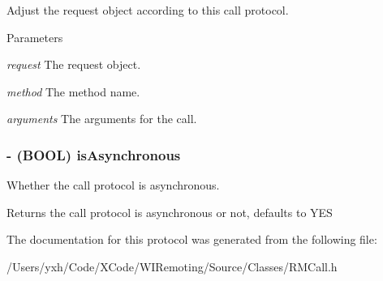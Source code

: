 Adjust the request object according to this call protocol. 
\begin{DoxyParams}{Parameters}
\item[{\em request}]The request object. \item[{\em method}]The method name. \item[{\em arguments}]The arguments for the call. \end{DoxyParams}
\hypertarget{protocol_r_m_call_protocol-p_ae4432e31198f1f116480ec4f1ed46d92}{
\subsubsection[{isAsynchronous}]{\setlength{\rightskip}{0pt plus 5cm}-\/ (BOOL) isAsynchronous }}
\label{protocol_r_m_call_protocol-p_ae4432e31198f1f116480ec4f1ed46d92}


Whether the call protocol is asynchronous. \begin{DoxyReturn}{Returns}
the call protocol is asynchronous or not, defaults to YES 
\end{DoxyReturn}


The documentation for this protocol was generated from the following file:\begin{DoxyCompactItemize}
\item 
/Users/yxh/Code/XCode/WIRemoting/Source/Classes/RMCall.h\end{DoxyCompactItemize}
